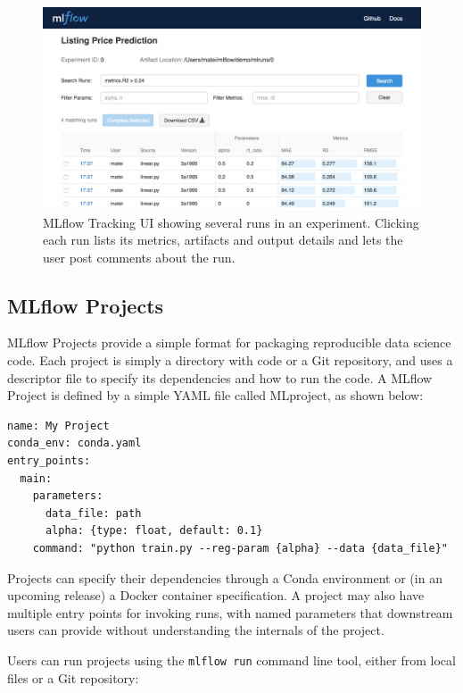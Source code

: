\documentclass[11pt]{article}
\begin{document}
\begin{figure}[h]
\centering
\includegraphics[width=\textwidth]{tracking.png}
\caption{MLflow Tracking UI showing several runs in an experiment. Clicking each run lists its metrics, artifacts and output details and lets the user post comments about the run.}
\label{fig:tracking-ui}
\end{figure}

\subsection{MLflow Projects}

MLflow Projects provide a simple format for packaging reproducible data science code. Each project is simply a directory with code or a Git repository, and uses a descriptor file to specify its dependencies and how to run the code. A MLflow Project is defined by a simple YAML file called MLproject, as shown below:

\begin{Verbatim}[frame=single,fontsize=\small,samepage=true]
name: My Project
conda_env: conda.yaml
entry_points:
  main:
    parameters:
      data_file: path
      alpha: {type: float, default: 0.1}
    command: "python train.py --reg-param {alpha} --data {data_file}"
\end{Verbatim}


Projects can specify their dependencies through a Conda environment or (in an upcoming release) a Docker container specification. A project may also have multiple entry points for invoking runs, with named parameters that downstream users can provide without understanding the internals of the project.

Users can run projects using the \texttt{mlflow run} command line tool, either from local files or a Git repository:
\end{document}
